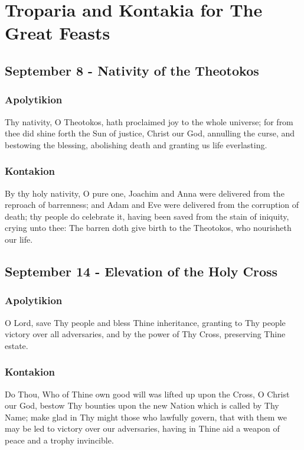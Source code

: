 \section{Troparia and Kontakia for The Great Feasts}

\subsection{September 8 - Nativity of the Theotokos}

\subsubsection{Apolytikion}

 Thy nativity, O Theotokos, hath proclaimed joy to the whole universe; for from thee did shine forth the Sun of justice, Christ our God, annulling the curse, and bestowing the blessing, abolishing death and granting us life everlasting.

\subsubsection{Kontakion}

 By thy holy nativity, O pure one, Joachim and Anna were delivered from the reproach of barrenness; and Adam and Eve were delivered from the corruption of death; thy people do celebrate it, having been saved from the stain of iniquity, crying unto thee: The barren doth give birth to the Theotokos, who nourisheth our life.

\subsection{September 14 - Elevation of the Holy Cross}

\subsubsection{Apolytikion}

 O Lord, save Thy people and bless Thine inheritance, granting to Thy people victory over all adversaries, and by the power of Thy Cross, preserving Thine estate.

\subsubsection{Kontakion}

 Do Thou, Who of Thine own good will was lifted up upon the Cross, O Christ our God, bestow Thy bounties upon the new Nation which is called by Thy Name; make glad in Thy might those who lawfully govern, that with them we may be led to victory over our adversaries, having in Thine aid a weapon of peace and a trophy invincible.

